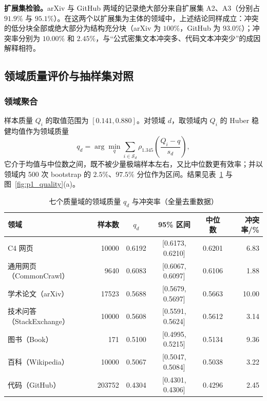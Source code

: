 \textbf{扩展集检验。}arXiv 与 GitHub 两域的记录绝大部分来自扩展集 A2、A3（分别占 $91.9\%$ 与 $95.1\%$）。在这两个以扩展集为主体的领域中，上述结论同样成立：冲突的低分块全部或绝大部分为结构充分块（arXiv 为 $100\%$，GitHub 为 $93.0\%$）；冲突率分别为 $10.00\%$ 和 $2.45\%$，与“公式密集文本冲突多、代码文本冲突少”的成因解释相符。

\subsection{领域质量评价与抽样集对照}

\subsubsection{领域聚合}

样本质量 $Q_i$ 的取值范围为 $[0.141,0.880]$。对领域 $d$，取领域内 $Q_i$ 的 Huber 稳健均值作为领域质量
\begin{equation}
q_d=\arg\min_q\sum_{i\in\mathcal S_d}\rho_{1.345}\!\left(\frac{Q_i-q}{s_d}\right),
\label{eq:p1_qd}
\end{equation}
它介于均值与中位数之间，既不被少量极端样本左右，又比中位数更有效率；并以领域内 500 次 bootstrap 的 $2.5\%$、$97.5\%$ 分位作为区间。结果见表~\ref{tab:p1_quality} 与图~\ref{fig:p1_quality}(a)。

\begin{table}[htbp]
\centering
\small
\caption{七个质量域的领域质量 $q_d$ 与冲突率（全量去重数据）}
\label{tab:p1_quality}
\begin{tabular}{lrcccr}
\toprule
领域 & 样本数 & $q_d$ & 95\% 区间 & 中位数 & 冲突率/\% \\
\midrule
C4 网页 & 10000 & 0.6192 & [0.6173, 0.6210] & 0.6201 & 6.83 \\
通用网页（CommonCrawl） & 9640 & 0.6083 & [0.6067, 0.6097] & 0.6106 & 1.88 \\
学术论文（arXiv） & 17523 & 0.5688 & [0.5679, 0.5697] & 0.5663 & 10.00 \\
技术问答（StackExchange） & 10000 & 0.5608 & [0.5591, 0.5624] & 0.5612 & 3.14 \\
图书（Book） & 171 & 0.5100 & [0.4995, 0.5215] & 0.5134 & 9.36 \\
百科（Wikipedia） & 10000 & 0.5067 & [0.5047, 0.5084] & 0.5038 & 3.22 \\
代码（GitHub） & 203752 & 0.4304 & [0.4301, 0.4306] & 0.4296 & 2.45 \\
\bottomrule
\end{tabular}
\end{table}

